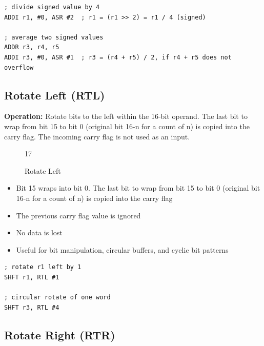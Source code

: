 \begin{example}
	\begin{lstlisting}
; divide signed value by 4
ADDI r1, #0, ASR #2  ; r1 = (r1 >> 2) = r1 / 4 (signed)

; average two signed values
ADDR r3, r4, r5
ADDI r3, #0, ASR #1  ; r3 = (r4 + r5) / 2, if r4 + r5 does not overflow
	\end{lstlisting}
	\caption{Signed Divide and Averaging (ASR)}
\end{example}

\subsection{Rotate Left (RTL)}

\textbf{Operation:} Rotate bits to the left within the 16-bit operand. The last bit to wrap from bit 15 to bit 0 (original
bit 16-n for a count of n) is copied into the carry flag. The incoming carry flag is not used as an input.

\begin{figure}[H]
	\centering
	\begin{bytefield}[bitwidth=1.2em]{17}
		 \\
	\end{bytefield}
	\caption{Rotate Left}
\end{figure}

\begin{itemize}
	\item Bit 15 wraps into bit 0. The last bit to wrap from bit 15 to bit 0 (original bit 16-n for a count of n) is copied into
	      the carry flag
	\item The previous carry flag value is ignored
	\item No data is lost
	\item Useful for bit manipulation, circular buffers, and cyclic bit patterns
\end{itemize}

\begin{example}
	\begin{lstlisting}
; rotate r1 left by 1
SHFT r1, RTL #1

; circular rotate of one word
SHFT r3, RTL #4
	\end{lstlisting}
	\caption{Rotating a Value Left (RTL)}
\end{example}

\subsection{Rotate Right (RTR)}

